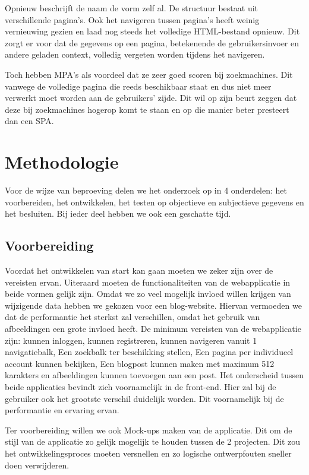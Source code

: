 \documentclass{hogent-article}
\begin{document}
Opnieuw beschrijft de naam de vorm zelf al.
De structuur bestaat uit verschillende pagina's.
Ook het navigeren tussen pagina's heeft weinig vernieuwing gezien en laad nog steeds het volledige HTML-bestand opnieuw.
Dit zorgt er voor dat de gegevens op een pagina, betekenende de gebruikersinvoer en andere geladen context, volledig vergeten worden tijdens het navigeren.

Toch hebben MPA's als voordeel dat ze zeer goed scoren bij zoekmachines.
Dit vanwege de volledige pagina die reeds beschikbaar staat en dus niet meer verwerkt moet worden aan de gebruikers' zijde.
Dit wil op zijn beurt zeggen dat deze bij zoekmachines hogerop komt te staan en op die manier beter presteert dan een SPA.


\section{Methodologie}
Voor de wijze van beproeving delen we het onderzoek op in 4 onderdelen: het voorbereiden, het ontwikkelen, het testen op objectieve en subjectieve gegevens en het besluiten.
Bij ieder deel hebben we ook een geschatte tijd.

\subsection{Voorbereiding}
Voordat het ontwikkelen van start kan gaan moeten we zeker zijn over de vereisten ervan.
Uiteraard moeten de functionaliteiten van de webapplicatie in beide vormen gelijk zijn.
Omdat we zo veel mogelijk invloed willen krijgen van wijzigende data hebben we gekozen voor een blog-website.
Hiervan vermoeden we dat de performantie het sterkst zal verschillen, omdat het gebruik van afbeeldingen een grote invloed heeft.
De minimum vereisten van de webapplicatie zijn:
kunnen inloggen,
kunnen registreren,
kunnen navigeren vanuit 1 navigatiebalk,
Een zoekbalk ter beschikking stellen,
Een pagina per individueel account kunnen bekijken,
Een blogpost kunnen maken met maximum 512 karakters
en afbeeldingen kunnen toevoegen aan een post.
Het onderscheid tussen beide applicaties bevindt zich voornamelijk in de front-end.
Hier zal bij de gebruiker ook het grootste verschil duidelijk worden.
Dit voornamelijk bij de performantie en ervaring ervan.

Ter voorbereiding willen we ook Mock-ups maken van de applicatie.
Dit om de stijl van de applicatie zo gelijk mogelijk te houden tussen de 2 projecten.
Dit zou het ontwikkelingsproces moeten versnellen en zo logische ontwerpfouten sneller doen verwijderen.
\end{document}
